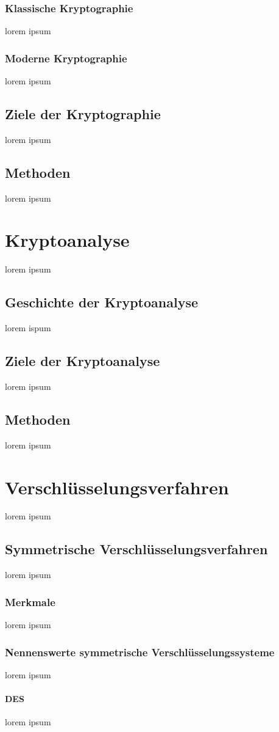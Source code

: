 \documentclass[12pt,a4paper]{report}
\begin{document}
\subsubsection{Klassische Kryptographie}
lorem ipsum
\subsubsection{Moderne Kryptographie}
lorem ipsum
\subsection{Ziele der Kryptographie}
lorem ipsum
\subsection{Methoden}
lorem ipsum
\section{Kryptoanalyse}
lorem ipsum
\subsection{Geschichte der Kryptoanalyse}
lorem ispum
\subsection{Ziele der Kryptoanalyse}
lorem ipsum
\subsection{Methoden}
lorem ipsum
\section{Verschlüsselungsverfahren}
lorem ipsum
\subsection{Symmetrische Verschlüsselungsverfahren}
lorem ipsum
\subsubsection{Merkmale}
lorem ipsum
\subsubsection{Nennenswerte symmetrische Verschlüsselungssysteme}
lorem ipsum
\paragraph{DES}
lorem ipsum
\end{document}
